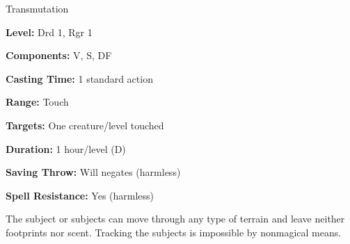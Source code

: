 
Transmutation

\textbf{Level:} Drd 1, Rgr 1

\textbf{Components:} V, S, DF

\textbf{Casting Time:} 1 standard action

\textbf{Range:} Touch

\textbf{Targets:} One creature/level touched

\textbf{Duration:} 1 hour/level (D)

\textbf{Saving Throw:} Will negates (harmless)

\textbf{Spell Resistance:} Yes (harmless)

The subject or subjects can move through any type of terrain and leave neither 
footprints nor scent. Tracking the subjects is impossible by nonmagical means.

